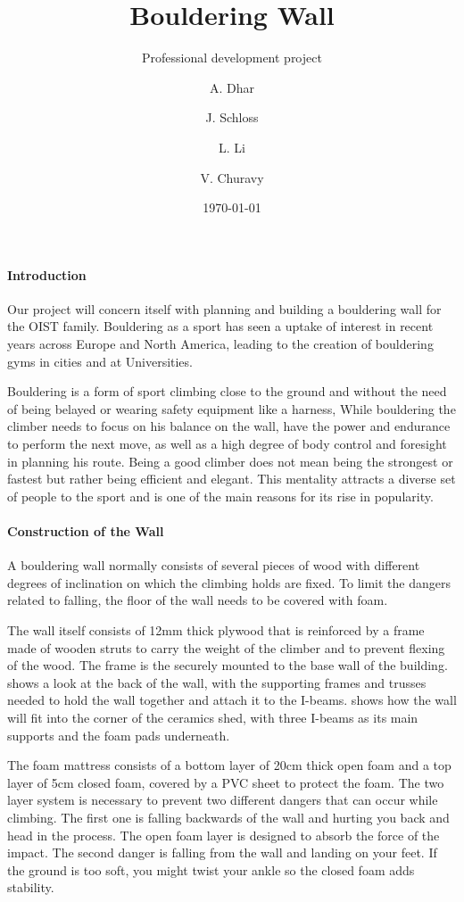 \documentclass[a4paper, 12pt]{scrreprt}
\date{\today}
\title{Bouldering Wall}
\subtitle{Professional development project}
\author{A. Dhar}
\author{J. Schloss}
\author{L. Li}
\affil{Physical Sciences}
\author{V. Churavy}
\affil{Life Sciences}
\begin{document}
\maketitle
\paragraph{Introduction}
Our project will concern itself with planning and building a bouldering wall for the OIST family.
Bouldering as a sport has seen a uptake of interest in recent years across Europe and North America, leading to the creation of bouldering gyms in cities and at Universities. 

Bouldering is a form of sport climbing close to the ground and without the need of being belayed or wearing safety equipment like a harness, While bouldering the climber needs to focus on his balance on the wall, have the power and endurance to perform the next move, as well as a high degree of body control and foresight in planning his route. Being a good climber does not mean being the strongest or fastest but rather being efficient and elegant. This mentality attracts a diverse set of people to the sport and is one of the main reasons for its rise in popularity.

\paragraph{Construction of the Wall}
A bouldering wall normally consists of several pieces of wood with different degrees of inclination on which the climbing holds are fixed. To limit the dangers related to falling, the floor of the wall needs to be covered with foam.

The wall itself consists of 12mm thick plywood that is reinforced by a frame made of wooden struts to carry the weight of the climber and to prevent flexing of the wood. The frame is the securely mounted to the base wall of the building. 
 shows a look at the back of the wall, with the supporting frames and trusses needed to hold the wall together and attach it to the I-beams.  shows how the wall will fit into the corner of the ceramics shed, with three I-beams as its main supports and the foam pads underneath.

The foam mattress consists of a bottom layer of 20cm thick open foam and a top layer of 5cm closed foam, covered by a PVC sheet to protect the foam.
The two layer system is necessary to prevent two different dangers that can occur while climbing. The first one is falling backwards of the wall and hurting you back and head in the process. The open foam layer is designed to absorb the force of the impact. The second danger is falling from the wall and landing on your feet. If the ground is too soft, you might twist your ankle so the closed foam adds stability.
\end{document}
